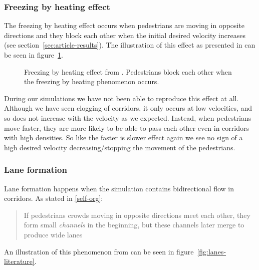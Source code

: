 \subsubsection{Freezing by heating effect}
The freezing by heating effect occurs when pedestrians are moving in opposite 
directions and they block each other when the initial desired velocity increases (see 
section~\ref{sec:article-results}). The illustration of this effect as 
presented in \cite{oscil} can be seen in 
figure~\ref{fig:freezing_by_heating_litterature}.

\begin{figure}[h]
    \centering
    \caption[Freezing by heating effect from \cite{oscil}]{Freezing by heating 
    effect from \cite{oscil}. Pedestrians block each other when the 
    freezing by heating phenomenon occurs.}
    \label{fig:freezing_by_heating_litterature}
\end{figure}

During our simulations we have not been able to reproduce this effect at all.  
Although we have seen clogging of corridors, it only occurs at low velocities, 
and so does not increase with the velocity as we expected. Instead, when 
pedestrians move faster, they are more likely to be able to pass each other 
even in corridors with high densities. So like the faster is slower
effect again we see no sign of a high desired velocity decreasing/stopping
the movement of the pedestrians.

\subsubsection{Lane formation}
Lane formation happens when the simulation contains bidirectional flow in 
corridors. As stated in \ref{self-org}:

\begin{quote}
    If pedestrians crowds moving in opposite directions meet each other, they 
    form small \emph{channels} in the beginning, but these channels later 
    merge to produce wide lanes
\end{quote}

An illustration of this phenomenon from \cite{lanes} can be seen in 
figure~\ref{fig:lanes-literature}. 

